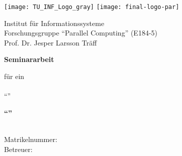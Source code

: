 
\pagestyle{empty}

\begin{titlepage}
\begin{center}
\texttt{[image: TU\_INF\_Logo\_gray]}
\hfill
\texttt{[image: final-logo-par]}

\end{center}

\vspace*{1cm}

\begin{center}

\begin{Large}
Institut für Informationssysteme\\
Forschungsgruppe ``Parallel Computing'' (E184-5)\\
Prof. Dr. Jesper Larsson Träff\\[2cm]
\end{Large}

\begin{Huge}
\textbf{Seminararbeit}\\
\end{Huge}

\vspace*{1cm}

\begin{Large}
für ein \\
\sptopic{} \\
``\seminarname{}'' 
\end{Large}


\vspace*{2cm}

\begin{Large}
\textbf{``\seminartitle{}''}
\end{Large}

\vspace*{2cm}

\begin{Large}
\studname \\
Matrikelnummer: \studmatrikel\\[2cm]

Betreuer: \spbetreuer

\vspace*{2cm}
\spdate \\

\end{Large}
\end{center}

\end{titlepage}
